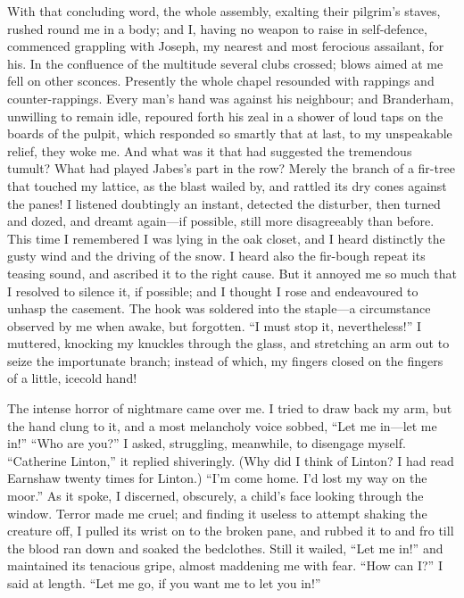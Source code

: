 With that concluding word, the whole assembly,
exalting their pilgrim's staves, rushed round me in a body; and I,
having no weapon to raise in self-defence, commenced grappling with
Joseph, my nearest and most ferocious assailant, for his. In the
confluence of the multitude several clubs crossed; blows aimed at me
fell on other sconces. Presently the whole chapel resounded with
rappings and counter-rappings. Every man's hand was against his
neighbour; and Branderham, unwilling to remain idle, repoured forth his
zeal in a shower of loud taps on the boards of the pulpit, which
responded so smartly that at last, to my unspeakable relief, they woke
me. And what was it that had suggested the tremendous tumult? What had
played Jabes's part in the row?  Merely the branch of a fir-tree that
touched my lattice, as the blast wailed by, and rattled its dry cones
against the panes! I listened doubtingly an instant, detected the
disturber, then turned and dozed, and dreamt again---if possible, still
more disagreeably than before.  This time I remembered I was lying in
the oak closet, and I heard distinctly the gusty wind and the driving of
the snow. I heard also the fir-bough repeat its teasing sound, and
ascribed it to the right cause.  But it annoyed me so much that I
resolved to silence it, if possible; and I thought I rose and
endeavoured to unhasp the casement. The hook was soldered into the
staple---a circumstance observed by me when awake, but forgotten. ``I
must stop it, nevertheless!'' I muttered, knocking my knuckles through
the glass, and stretching an arm out to seize the importunate branch;
instead of which, my fingers closed on the fingers of a little, icecold
hand!

The intense horror of nightmare came over me.  I tried to draw
back my arm, but the hand clung to it, and a most melancholy voice
sobbed, ``Let me in---let me in!'' ``Who are you?'' I asked, struggling,
meanwhile, to disengage myself. ``Catherine Linton,'' it replied
shiveringly. (Why did I think of Linton? I had read Earnshaw twenty
times for Linton.) ``I'm come home. I'd lost my way on the moor.''  As
it spoke, I discerned, obscurely, a child's face looking through the
window. Terror made me cruel; and finding it useless to attempt shaking
the creature off, I pulled its wrist on to the broken pane, and rubbed
it to and fro till the blood ran down and soaked the bedclothes. Still
it wailed, ``Let me in!'' and maintained its tenacious gripe, almost
maddening me with fear. ``How can I?''  I said at length. ``Let me go,
if you want me to let you in!''

